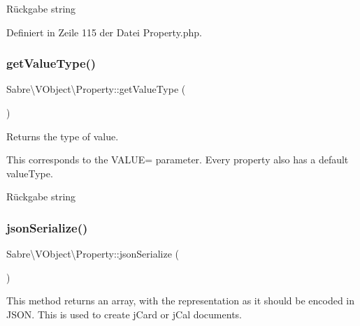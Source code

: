 \begin{DoxyReturn}{Rückgabe}
string 
\end{DoxyReturn}


Definiert in Zeile 115 der Datei Property.\+php.

\mbox{\label{class_sabre_1_1_v_object_1_1_property_a1c1501c7c11f9c4cbb8368a50be657a3}} 
\subsubsection{\texorpdfstring{get\+Value\+Type()}{getValueType()}}
{\footnotesize\ttfamily Sabre\textbackslash{}\+V\+Object\textbackslash{}\+Property\+::get\+Value\+Type (\begin{DoxyParamCaption}{ }\end{DoxyParamCaption})\hspace{0.3cm}{\ttfamily [abstract]}}

Returns the type of value.

This corresponds to the V\+A\+L\+UE= parameter. Every property also has a \textquotesingle{}default\textquotesingle{} value\+Type.

\begin{DoxyReturn}{Rückgabe}
string 
\end{DoxyReturn}
\mbox{\label{class_sabre_1_1_v_object_1_1_property_aa10cefe59518806f5d78519246cc56a2}} 
\subsubsection{\texorpdfstring{json\+Serialize()}{jsonSerialize()}}
{\footnotesize\ttfamily Sabre\textbackslash{}\+V\+Object\textbackslash{}\+Property\+::json\+Serialize (\begin{DoxyParamCaption}{ }\end{DoxyParamCaption})}

This method returns an array, with the representation as it should be encoded in J\+S\+ON. This is used to create j\+Card or j\+Cal documents.

